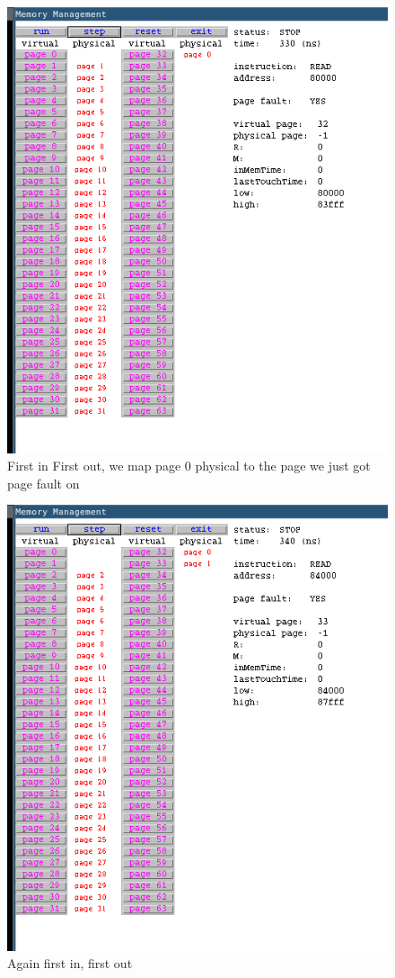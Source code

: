 \documentclass{article}
\begin{document}
\begin{figure}[H]
        \caption{First in First out, we map page 0 physical to the page we just
	got page fault on}                                            
	\includegraphics[width=\linewidth]{mm5}
\end{figure}
\begin{figure}[H]
        \caption{Again first in, first out}                                            
	\includegraphics[width=\linewidth]{mm6}
\end{figure}
\end{document}
